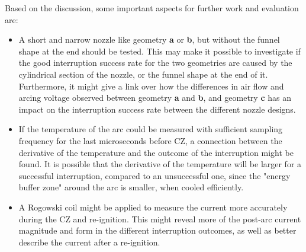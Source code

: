\documentclass[10pt,b5paper,twoside]{article}
\begin{document}
Based on the discussion, some important aspects for further work and evaluation are:
\begin{itemize}
\item A short and narrow nozzle like geometry \textbf{a} or \textbf{b}, but without the funnel shape at the end should be tested. This may make it possible to investigate if the good interruption success rate for the two geometries are caused by the cylindrical section of the nozzle, or the funnel shape at the end of it. Furthermore, it might give a link over how the differences in air flow and arcing voltage observed between geometry \textbf{a} and \textbf{b}, and geometry \textbf{c} has an impact on the interruption success rate between the different nozzle designs.

\item If the temperature of the arc could be measured with sufficient sampling frequency for the last microseconds before CZ, a connection between the derivative of the temperature and the outcome of the interruption might be found. It is possible that the derivative of the temperature will be larger for a successful interruption, compared to an unsuccessful one, since the "energy buffer zone" around the arc is smaller, when cooled efficiently. 

\item  A Rogowski coil might be applied to measure the current more accurately during the CZ and re-ignition. This might reveal more of the post-arc current magnitude and form in the different interruption outcomes, as well as better describe the current after a re-ignition.
\end{itemize}

\cleardoublepage
\end{document}

